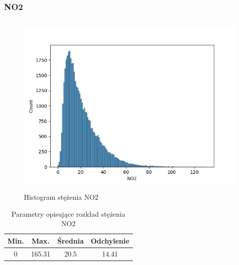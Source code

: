 \documentclass[18pt, letterpaper]{article}
\begin{document}
\subsubsection{NO2}
\begin{figure}[H]
\centering
\includegraphics[width=120mm, height=90mm]{visualisations/histograms/NO2_hist.png}
\caption{Histogram stężenia NO2}
\end{figure}
\begin{table}[H]
\centering
\begin{tabular}{|c|c|c|c|}
\hline
Min.  & Max. & Średnia & Odchylenie \\ \hline
0 & 165.31 & 20.5   & 14.41      \\ \hline
\end{tabular}
\caption{Parametry opisujące rozkład stężenia NO2}
\end{table}
\end{document}

